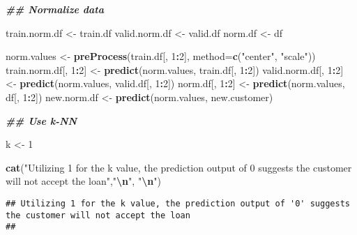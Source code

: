 \documentclass[
]{article}
\newenvironment{Shaded}{\begin{snugshade}}{\end{snugshade}}
\newcommand{\AttributeTok}[1]{\textcolor[rgb]{0.13,0.29,0.53}{#1}}
\newcommand{\DecValTok}[1]{\textcolor[rgb]{0.00,0.00,0.81}{#1}}
\newcommand{\DocumentationTok}[1]{\textcolor[rgb]{0.56,0.35,0.01}{\textbf{\textit{#1}}}}
\newcommand{\FunctionTok}[1]{\textcolor[rgb]{0.13,0.29,0.53}{\textbf{#1}}}
\newcommand{\NormalTok}[1]{#1}
\newcommand{\OtherTok}[1]{\textcolor[rgb]{0.56,0.35,0.01}{#1}}
\newcommand{\SpecialCharTok}[1]{\textcolor[rgb]{0.81,0.36,0.00}{\textbf{#1}}}
\newcommand{\StringTok}[1]{\textcolor[rgb]{0.31,0.60,0.02}{#1}}
\begin{document}
\begin{Shaded}
\begin{Highlighting}[]
\DocumentationTok{\#\# Normalize data}

\NormalTok{train.norm.df }\OtherTok{\textless{}{-}}\NormalTok{ train.df}
\NormalTok{valid.norm.df }\OtherTok{\textless{}{-}}\NormalTok{ valid.df}
\NormalTok{norm.df }\OtherTok{\textless{}{-}}\NormalTok{ df}

\NormalTok{norm.values }\OtherTok{\textless{}{-}} \FunctionTok{preProcess}\NormalTok{(train.df[, }\DecValTok{1}\SpecialCharTok{:}\DecValTok{2}\NormalTok{], }\AttributeTok{method=}\FunctionTok{c}\NormalTok{(}\StringTok{"center"}\NormalTok{, }\StringTok{"scale"}\NormalTok{))}
\NormalTok{train.norm.df[, }\DecValTok{1}\SpecialCharTok{:}\DecValTok{2}\NormalTok{] }\OtherTok{\textless{}{-}} \FunctionTok{predict}\NormalTok{(norm.values, train.df[, }\DecValTok{1}\SpecialCharTok{:}\DecValTok{2}\NormalTok{])}
\NormalTok{valid.norm.df[, }\DecValTok{1}\SpecialCharTok{:}\DecValTok{2}\NormalTok{] }\OtherTok{\textless{}{-}} \FunctionTok{predict}\NormalTok{(norm.values, valid.df[, }\DecValTok{1}\SpecialCharTok{:}\DecValTok{2}\NormalTok{])}
\NormalTok{norm.df[, }\DecValTok{1}\SpecialCharTok{:}\DecValTok{2}\NormalTok{] }\OtherTok{\textless{}{-}} \FunctionTok{predict}\NormalTok{(norm.values, df[, }\DecValTok{1}\SpecialCharTok{:}\DecValTok{2}\NormalTok{])}
\NormalTok{new.norm.df }\OtherTok{\textless{}{-}} \FunctionTok{predict}\NormalTok{(norm.values, new.customer)}
\end{Highlighting}
\end{Shaded}

\begin{Shaded}
\begin{Highlighting}[]
\DocumentationTok{\#\# Use k{-}NN}

\NormalTok{k }\OtherTok{\textless{}{-}} \DecValTok{1}

\FunctionTok{cat}\NormalTok{(}\StringTok{"Utilizing 1 for the k value, the prediction output of \textquotesingle{}0\textquotesingle{} suggests the customer will not accept the loan"}\NormalTok{,}\StringTok{"}\SpecialCharTok{\textbackslash{}n}\StringTok{"}\NormalTok{, }\StringTok{"}\SpecialCharTok{\textbackslash{}n}\StringTok{"}\NormalTok{)}
\end{Highlighting}
\end{Shaded}

\begin{verbatim}
## Utilizing 1 for the k value, the prediction output of '0' suggests the customer will not accept the loan 
## 
\end{verbatim}
\end{document}
